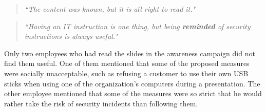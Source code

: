 \documentclass[b5paper, twoside, openright, 11pt]{report}
\begin{document}
\begin{quote}
\textit{``The content was known, but it is all right to read it."}
\end{quote} 

\begin{quote}
\textit{``Having an IT instruction is one thing, but being \textbf{reminded} of security instructions is always useful."}
\end{quote}

Only two employees who had read the slides in the awareness campaign did not find them useful. One of them mentioned that some of the proposed measures were socially unacceptable, such as refusing a customer to use their own USB sticks when using one of the organization's computers during a presentation. The other employee mentioned that some of the measures were so strict that he would rather take the risk of security incidents than following them.
\end{document}
